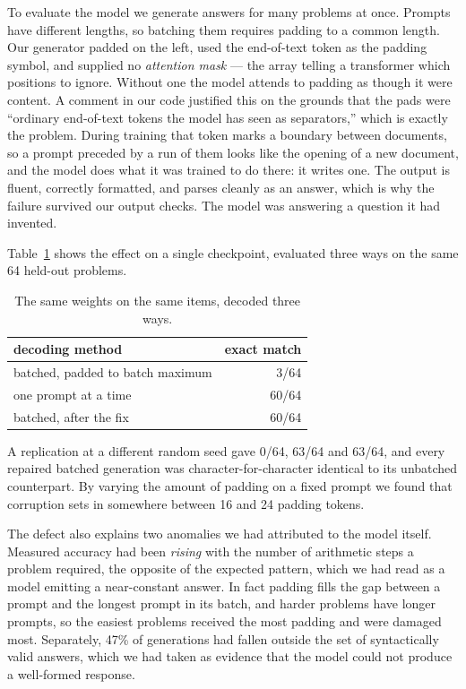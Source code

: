 \documentclass[10pt,twocolumn]{article}
\begin{document}
To evaluate the model we generate answers for many problems at once. Prompts
have different lengths, so batching them requires padding to a common length.
Our generator padded on the left, used the end-of-text token as the padding
symbol, and supplied no \emph{attention mask} --- the array telling a
transformer which positions to ignore. Without one the model attends to padding
as though it were content. A comment in our code justified this on the grounds
that the pads were ``ordinary end-of-text tokens the model has seen as
separators,'' which is exactly the problem. During training that token marks a
boundary between documents, so a prompt preceded by a run of them looks like the
opening of a new document, and the model does what it was trained to do there:
it writes one. The output is fluent, correctly formatted, and parses cleanly as
an answer, which is why the failure survived our output checks. The model was
answering a question it had invented.

Table~\ref{tab:pad} shows the effect on a single checkpoint, evaluated three
ways on the same 64 held-out problems.

\begin{table}[h]
\centering\small
\begin{tabular}{lr}
\toprule
decoding method & exact match \\
\midrule
batched, padded to batch maximum & 3/64 \\
one prompt at a time & 60/64 \\
batched, after the fix & 60/64 \\
\bottomrule
\end{tabular}
\caption{The same weights on the same items, decoded three ways.}
\label{tab:pad}
\end{table}

A replication at a different random seed gave 0/64, 63/64 and 63/64, and every
repaired batched generation was character-for-character identical to its
unbatched counterpart. By varying the amount of padding on a fixed prompt we
found that corruption sets in somewhere between 16 and 24 padding tokens.

The defect also explains two anomalies we had attributed to the model itself.
Measured accuracy had been \emph{rising} with the number of arithmetic steps a
problem required, the opposite of the expected pattern, which we had read as a
model emitting a near-constant answer. In fact padding fills the gap between a
prompt and the longest prompt in its batch, and harder problems have longer
prompts, so the easiest problems received the most padding and were damaged
most. Separately, 47\% of generations had fallen outside the set of
syntactically valid answers, which we had taken as evidence that the model
could not produce a well-formed response.
\end{document}
